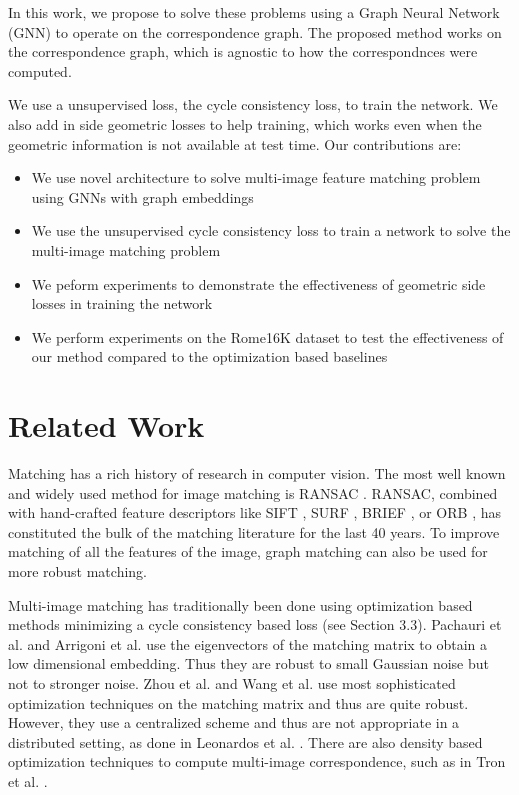 \documentclass[10pt,twocolumn,letterpaper]{article}
\begin{document}
In this work, we propose to solve these problems using a Graph Neural Network (GNN) to operate on the correspondence graph.
The proposed method works on the correspondence graph, which is agnostic to how the correspondnces were computed.

We use a unsupervised loss, the cycle consistency loss, to train the network.
We also add in side geometric losses to help training, which works even when the geometric information is not available at test time.
Our contributions are:
\begin{itemize}
\item We use novel architecture to solve multi-image feature matching problem using GNNs with graph embeddings
\item We use the unsupervised cycle consistency loss to train a network to solve the multi-image matching problem
\item We peform experiments to demonstrate the effectiveness of geometric side losses in training the network
\item We perform experiments on the Rome16K \cite{li2010location} dataset to test the effectiveness of our method compared to the optimization based baselines
\end{itemize}


\section{Related Work}

Matching has a rich history of research in computer vision.
The most well known and widely used method for image matching is RANSAC \cite{fischler1981random}.
RANSAC, combined with hand-crafted feature descriptors like SIFT \cite{lowe2004distinctive}, SURF \cite{bay2006surf}, BRIEF \cite{calonder2012brief}, or ORB \cite{mur2015orb}, has constituted the bulk of the matching literature for the last 40 years.
To improve matching of all the features of the image, graph matching \cite{suh2015subgraph, hu2016distributable} can also be used for more robust matching.

Multi-image matching has traditionally been done using optimization based methods minimizing a cycle consistency based loss (see Section 3.3).
Pachauri et al. \cite{pachauri2013solving} and Arrigoni et al. \cite{arrigoni2017synchronization} use the eigenvectors of the matching matrix to obtain a low dimensional embedding. 
Thus they are robust to small Gaussian noise but not to stronger noise.
Zhou et al. \cite{zhou2015multi} and Wang et al. \cite{wang2017multi} use most sophisticated optimization techniques on the matching matrix and thus are quite robust.
However, they use a centralized scheme and thus are not appropriate in a distributed setting, as done in Leonardos et al. \cite{leonardos2016distributed}.
There are also density based optimization techniques to compute multi-image correspondence, such as in Tron et al. \cite{tron2017fast}.
\end{document}
